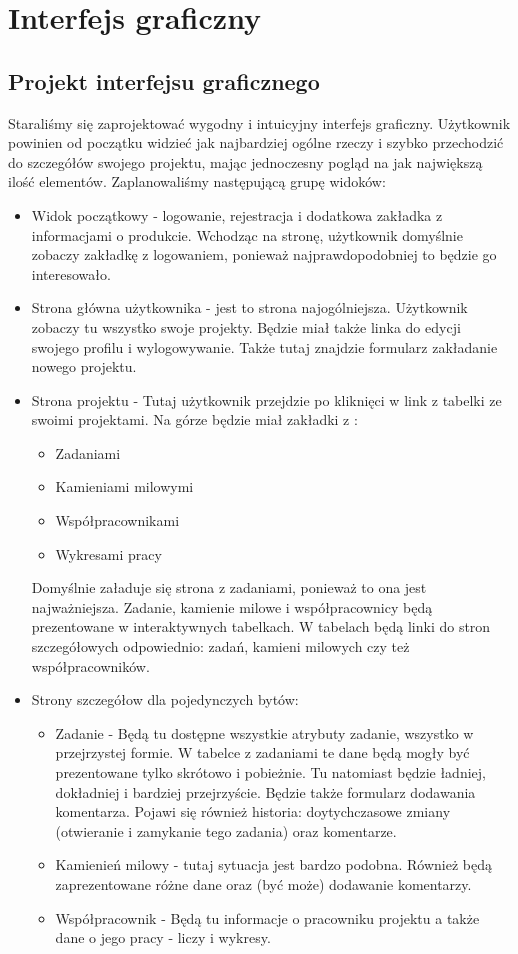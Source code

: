 \documentclass[a4paper,12pt,notitlepage]{mwrep}
\begin{document}
\section{Interfejs graficzny}

\subsection{Projekt interfejsu graficznego}
Staraliśmy się zaprojektować wygodny i intuicyjny interfejs graficzny. Użytkownik powinien od początku widzieć jak 
najbardziej ogólne rzeczy i szybko przechodzić do szczegółów swojego projektu, mając jednoczesny pogląd na jak 
największą ilość elementów. Zaplanowaliśmy następującą grupę widoków:
\begin{itemize}
	\item	Widok początkowy - logowanie, rejestracja i dodatkowa zakładka z informacjami o produkcie. Wchodząc na stronę, 
		użytkownik domyślnie zobaczy zakładkę z logowaniem, ponieważ najprawdopodobniej to będzie go interesowało.
	\item	Strona główna użytkownika - jest to strona najogólniejsza. Użytkownik zobaczy tu wszystko swoje projekty. Będzie miał 
		także linka do edycji swojego profilu i wylogowywanie. Także tutaj znajdzie formularz zakładanie nowego projektu.
	\item	Strona projektu - Tutaj użytkownik przejdzie po kliknięci w link z tabelki ze swoimi projektami. Na górze będzie miał 
		zakładki z :
	\begin{itemize}
		\item	Zadaniami
		\item	Kamieniami milowymi
		\item	Współpracownikami
		\item	Wykresami pracy
	\end{itemize}
		Domyślnie załaduje się strona z zadaniami, ponieważ to ona jest najważniejsza. Zadanie, kamienie milowe i współpracownicy 
		będą prezentowane w interaktywnych tabelkach. W tabelach będą linki do stron szczegółowych odpowiednio: zadań, 
		kamieni milowych czy też współpracowników.
	\item	Strony szczegółow dla pojedynczych bytów:
	\begin{itemize}
		\item	Zadanie - Będą tu dostępne wszystkie atrybuty zadanie, wszystko w przejrzystej formie. W tabelce z zadaniami te
			dane będą mogły być prezentowane tylko skrótowo i pobieżnie. Tu natomiast będzie ładniej, dokładniej i bardziej 
			przejrzyście. Będzie także formularz dodawania komentarza. Pojawi się również historia: doytychczasowe zmiany 
			(otwieranie i zamykanie tego zadania) oraz komentarze.
		\item	Kamienień milowy - tutaj sytuacja jest bardzo podobna. Również będą zaprezentowane różne dane oraz (być może) 
			dodawanie komentarzy.
		\item	Współpracownik - Będą tu informacje o pracowniku projektu a także dane o jego pracy - liczy i wykresy.
	\end{itemize}
\end{itemize}
\end{document}
